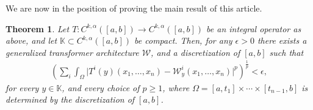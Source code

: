 \documentclass[a4paper,12pt,reqno]{amsart}
\newtheorem{thm}{Theorem}[section]
\theoremstyle{definition}
\theoremstyle{remark}
\begin{document}
We are now in the position of proving the main result of this article. 

\begin{thm}\label{thm:approx_transf}
    Let $T: C^{k,\alpha}([a,b]) \longrightarrow C^{k,\alpha}([a,b])$ be an integral operator as above, and let $\mathbb K \subset C^{k,\alpha}([a,b])$ be compact. Then, for any $\epsilon>0$ there exists a generalized transformer architecture $\mathcal W$, and a discretization of $[a,b]$ such that 
    \begin{eqnarray*}
        \left(\sum_i \int_\Omega\Big|T^i(y)(x_1,\ldots, x_n) - \mathcal W^i_y(x_1,\ldots, x_n)\Big|^p \right)^{\frac{1}{p}} < \epsilon, 
    \end{eqnarray*}
    for every $y \in \mathbb K$, and every choice of $p\geq 1$, where $\Omega = [a,t_1]\times \cdots \times [t_{n-1},b]$ is determined by the discretization of $[a,b]$.
\end{thm}
\end{document}
